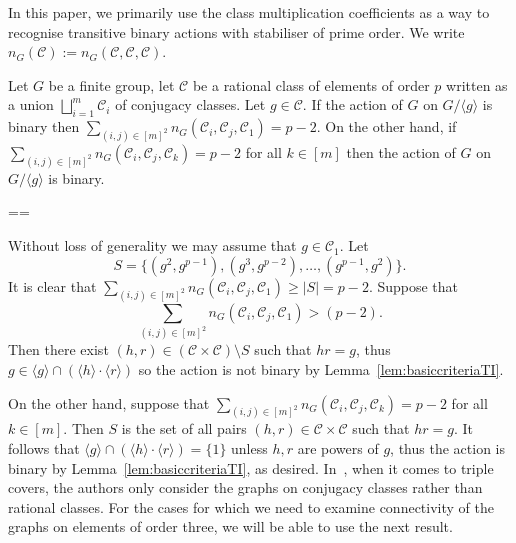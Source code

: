 \documentclass[11pt, a4paper]{amsart}
\makeatletter
\newcommand\C{\mathcal{C}}
\renewcommand{\proofname}{Proof}
\renewenvironment{proof}[1][\proofname]{\par
  \pushQED{\qed}  \normalfont \partopsep=\z@skip \topsep=\z@skip
  \trivlist
  \item[\hskip\labelsep
        \scshape
    #1\@addpunct{.}]\ignorespaces
}{  \popQED\endtrivlist\@endpefalse
}
\makeatother
\begin{document}
In this paper, we primarily use the class multiplication coefficients as a way to recognise transitive binary actions with stabiliser of prime order. We write $n_G(\mathcal{C}):=n_G(\mathcal{C},\mathcal{C},\mathcal{C})$.
\begin{lemma}\label{lem:cycbintest}
    Let $G$ be a finite group, let $\mathcal{C}$ be a rational class of elements of order $p$ written as a union $\bigsqcup_{i=1}^m\C_i$ of conjugacy classes. Let $g\in\mathcal{C}$. If the action of $G$ on $G/\langle g\rangle$ is binary then $\sum_{(i,j)\in[m]^2}n_G(\mathcal{C}_i,\mathcal{C}_j,\mathcal{C}_1)=p-2$. On the other hand, if $\sum_{(i,j)\in[m]^2}n_G(\mathcal{C}_i,\mathcal{C}_j,\mathcal{C}_k)=p-2$ for all $k\in[m]$ then the action of $G$ on $G/\langle g\rangle$ is binary.
\end{lemma}
\begin{proof}
        Without loss of generality we may assume that $g\in\C_1$. Let $$S=\{(g^2,g^{p-1}),(g^3,g^{p-2}),\dots,(g^{p-1},g^2)\}.$$ It is clear that $\sum_{(i,j)\in[m]^2}n_G(\mathcal{C}_i,\mathcal{C}_j,\mathcal{C}_1)\geq |S|=p-2$. Suppose that $$\sum_{(i,j)\in[m]^2}n_G(\mathcal{C}_i,\mathcal{C}_j,\mathcal{C}_1)>(p-2).$$ Then there exist $(h,r)\in (\mathcal{C}\times \mathcal{C})\setminus S$ such that $hr=g$, thus $g\in\langle g\rangle\cap(\langle h\rangle\cdot\langle r\rangle)$ so the action is not binary by Lemma~\ref{lem:basiccriteriaTI}. 

 On the other hand, suppose that $\sum_{(i,j)\in[m]^2}n_G(\mathcal{C}_i,\mathcal{C}_j,\mathcal{C}_k)=p-2$ for all $k\in[m]$. Then $S$ is the set of all pairs $(h,r)\in\mathcal{C}\times\mathcal{C}$ such that $hr=g$. It follows that $\langle g\rangle\cap(\langle h\rangle\cdot\langle r\rangle)=\{1\}$ unless $h,r$ are powers of $g$, thus the action is binary by Lemma~\ref{lem:basiccriteriaTI}, as desired.
\end{proof}
In~\cite{CDP}, when it comes to triple covers, the authors only consider the graphs on conjugacy classes rather than rational classes. For the cases for which we need to examine connectivity of the graphs on elements of order three, we will be able to use the next result. 
\end{document}
